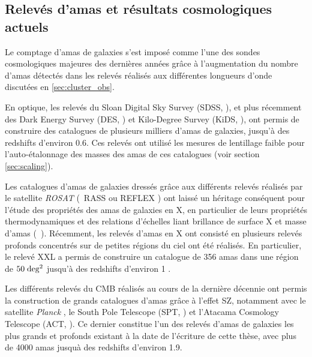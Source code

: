\subsection{Relevés d'amas et résultats cosmologiques actuels}\label{sec:current_surveys}

Le comptage d'amas de galaxies s'est imposé comme l'une des sondes cosmologiques majeures des dernières années grâce à l'augmentation du nombre d'amas détectés dans les relevés réalisés aux différentes longueurs d'onde discutées en \ref{sec:cluster_obs}.

En optique, les relevés du Sloan Digital Sky Survey (SDSS, \cite{rykoff_redmapper_2014,costanzi_methods_2019}), et plus récemment des Dark Energy Survey (DES, \cite{des_collaboration_dark_2020}) et Kilo-Degree Survey (KiDS, \cite{lesci_amico_2020}), ont permis de construire des catalogues de plusieurs milliers d'amas de galaxies, jusqu'à des redshifts d'environ 0.6.
Ces relevés ont utilisé les mesures de lentillage faible pour l'auto-étalonnage des masses des amas de ces catalogues (voir section \ref{sec:scaling}).

Les catalogues d'amas de galaxies dressés grâce aux différents relevés réalisés par le satellite \textit{ROSAT} (\eg\ RASS \cite{bohringer_northern_2000} ou REFLEX \cite{bohringer_rosat-eso_2004}) ont laissé un héritage conséquent pour l'étude des propriétés des amas de galaxies en X, en particulier de leurs propriétés thermodynamiques et des relations d'échelles liant brillance de surface X et masse d'amas (\eg\ \cite{arnaud_universal_2010, pratt_galaxy_2009,pratt_gas_2010}).
Récemment, les relevés d'amas en X ont consisté en plusieurs relevés profonds concentrés sur de petites régions du ciel ont été réalisés.
En particulier, le relevé XXL a permis de construire un catalogue de 356 amas dans une région de $50 \;{\rm deg^2}$ jusqu'à des redshifts d'environ 1 \cite{adami_xxl_2018}.

Les différents relevés du CMB réalisés au cours de la dernière décennie ont permis la construction de grands catalogues d'amas grâce à l'effet SZ, notamment avec le satellite \textit{Planck} \cite{planck_collaboration_planck_2016-1}, le South Pole Telescope (SPT, \cite{bleem_sptpol_2020}) et l'Atacama Cosmology Telescope (ACT, \cite{hilton_atacama_2021}).
Ce dernier constitue l'un des relevés d'amas de galaxies les plus grands et profonds existant à la date de l'écriture de cette thèse, avec plus de 4000 amas jusquà des redshifts d'environ 1.9.

